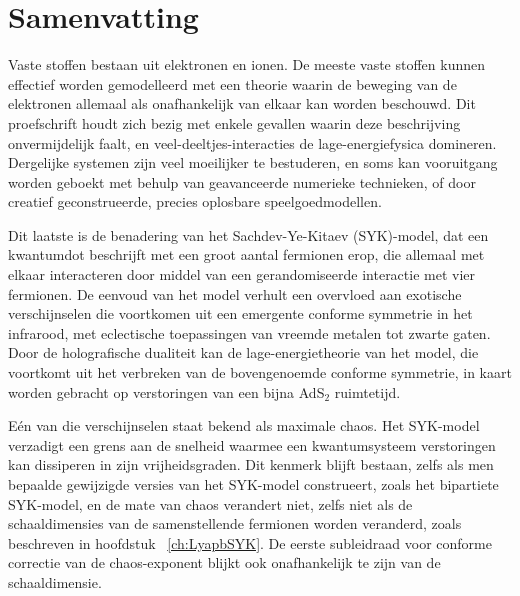 \newpage
\thispagestyle{empty}

\chapter*{Samenvatting}
\label{Samenvatting}


Vaste stoffen bestaan uit elektronen en ionen. De meeste vaste stoffen kunnen effectief worden gemodelleerd met een theorie waarin de beweging van de elektronen allemaal als onafhankelijk van elkaar kan worden beschouwd. Dit proefschrift houdt zich bezig met enkele gevallen waarin deze beschrijving onvermijdelijk faalt, en veel-deeltjes-interacties de lage-energiefysica domineren. Dergelijke systemen zijn veel moeilijker te bestuderen, en soms kan vooruitgang worden geboekt met behulp van geavanceerde numerieke technieken, of door creatief geconstrueerde, precies oplosbare speelgoedmodellen.
\par
Dit laatste is de benadering van het Sachdev-Ye-Kitaev (SYK)-model, dat een kwantumdot beschrijft met een groot aantal fermionen erop, die allemaal met elkaar interacteren door middel van een gerandomiseerde interactie met vier fermionen. De eenvoud van het model verhult een overvloed aan exotische verschijnselen die voortkomen uit een emergente conforme symmetrie in het infrarood, met eclectische toepassingen van vreemde metalen tot zwarte gaten. Door de holografische dualiteit kan de lage-energietheorie van het model, die voortkomt uit het verbreken van de bovengenoemde conforme symmetrie, in kaart worden gebracht op verstoringen van een bijna AdS${}_2$ ruimtetijd. 
\par
Eén van die verschijnselen staat bekend als maximale chaos. Het SYK-model verzadigt een grens aan de snelheid waarmee een kwantumsysteem verstoringen kan dissiperen in zijn vrijheidsgraden. Dit kenmerk blijft bestaan, zelfs als men bepaalde gewijzigde versies van het SYK-model construeert, zoals het bipartiete SYK-model, en de mate van chaos verandert niet, zelfs niet als de schaaldimensies van de samenstellende fermionen worden veranderd, zoals beschreven in hoofdstuk ~\ref {ch:LyapbSYK}. De eerste subleidraad voor conforme correctie van de chaos-exponent blijkt ook onafhankelijk te zijn van de schaaldimensie.
\par
